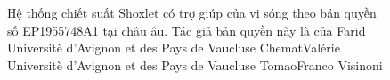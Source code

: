 \documentclass[
  twocolumn,
  landscape]{report}
\begin{document}
\begin{figure}


\caption{\label{fig-MicrowaveAssistedSoxhletExtraction}Hệ thống chiết
suất Shoxlet có trợ giúp của vi sóng theo bản quyền số EP1955748A1 tại
châu âu. Tác giả bản quyền này là của Farid Universitè d'Avignon et des
Pays de Vaucluse ChematValérie Universitè d'Avignon et des Pays de
Vaucluse TomaoFranco Visinoni}

\end{figure}%
\end{document}
